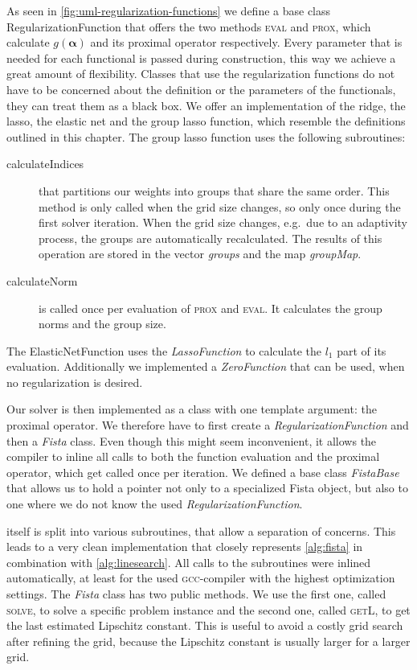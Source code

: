 As seen in \cref{fig:uml-regularization-functions} we define a base class RegularizationFunction that offers the two methods \textsc{eval} and \textsc{prox}, which calculate \(g(\bm{\alpha})\) and its proximal operator respectively.
Every parameter that is needed for each functional is passed during construction, this way we achieve a great amount of flexibility.
Classes that use the regularization functions do not have to be concerned about the definition or the parameters of the functionals, they can treat them as a black box.
We offer an implementation of the ridge, the lasso, the elastic net and the group lasso function, which resemble the definitions outlined in this chapter.
The group lasso function uses the following subroutines:
\begin{description}
\item[calculateIndices] that partitions our weights into groups that share the
  same order. This method is only called when the grid size changes, so only
  once during the first solver iteration. When the grid size changes, e.g.~due
  to an adaptivity process, the groups are automatically recalculated.
  The results of this operation are stored in the vector \emph{groups} and the map
  \emph{groupMap}.
\item[calculateNorm] is called once per evaluation of \textsc{prox} and
  \textsc{eval}. It calculates the group norms and the group size.
\end{description}
The ElasticNetFunction uses the \emph{LassoFunction} to calculate the  \(l_1\) part of its evaluation.
Additionally we implemented a \emph{ZeroFunction} that can be used, when no regularization is desired.

Our solver \fista is then implemented as a class with one template argument: the proximal operator.
We therefore have to first create a \emph{RegularizationFunction} and then a \emph{Fista} class.
Even though this might seem inconvenient, it allows the compiler to inline all
calls to both the function evaluation and the proximal operator, which get
called once per iteration.
We defined a base class \emph{FistaBase} that allows us to hold a pointer not only to a specialized Fista object, but also to one where we do not know the used \emph{RegularizationFunction}.

\fista itself is split into various subroutines, that allow a separation of concerns.
This leads to a very clean implementation that closely represents
\cref{alg:fista} in combination with \cref{alg:linesearch}.
All calls to the subroutines were inlined automatically, at least for the used \textsc{gcc}-compiler with the highest optimization settings.
The \emph{Fista} class has two public methods.
We use the first one, called \textsc{solve}, to solve a specific problem instance
and the second one, called \textsc{getL}, to get the last estimated Lipschitz constant.
This is useful to avoid a costly grid search after refining the grid, because the Lipschitz constant is usually larger for a larger grid.

